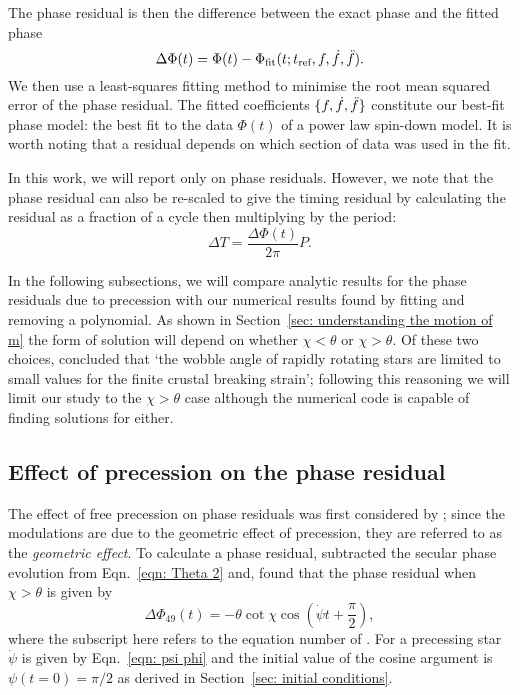 \documentclass[../full_thesis/full_thesis.tex]{subfiles}
\begin{document}
The phase residual is then the difference between the exact phase
and the fitted phase
\begin{equation}
  \Delta\Phi(t) = \Phi(t) - \Phi_{\mathrm{fit}}(t; t_{\textrm{ref}}, f, \dot{f}, \ddot{f}).
\end{equation}
We then use a least-squares fitting method to minimise the root mean squared
error of the phase residual. The fitted coefficients $\{f, \dot{f},
\ddot{f}\}$ constitute our best-fit phase model: the best fit to the data
$\Phi(t)$ of a power law spin-down model.  It is worth noting that a residual
depends on which section of data was used in the fit.

In this work, we will report only on phase residuals. However, we note that the
phase residual can also be re-scaled to give the timing residual by calculating
the residual as a fraction of a cycle then multiplying by the period:
\begin{equation}
    \Delta T = \frac{\Delta\Phi(t)}{2\pi} P.
    \label{eqn: phase to timing}
\end{equation}

In the following subsections, we will compare analytic results for the phase
residuals due to precession with our numerical results found by fitting and
removing a polynomial. As shown in Section~\ref{sec: understanding the motion of m}
the form of solution will depend on whether $\chi < \theta$ or $\chi > \theta$.
Of these two choices, \citet{Jones2001} concluded that `the wobble angle of
rapidly rotating stars are limited to small values for the finite crustal
breaking strain'; following this reasoning we will limit our study to the
$\chi > \theta$ case although the numerical code is capable of finding solutions
for either.

\subsection{Effect of precession on the phase residual}

The effect of free precession on phase residuals was first considered by
\citet{Nelson1990}; since the modulations are due to the geometric effect of
precession, they are referred to as the \emph{geometric effect}. To calculate a
phase residual, \citet{Jones2001} subtracted the secular phase evolution from
Eqn.~\ref{eqn: Theta 2} and, found that the phase residual when $\chi > \theta$
is given by
\begin{equation}
    \Delta\Phi_{49}(t) = -\theta \cot\chi\cos\left(\dot{\psi}t + \frac{\pi}{2}\right),
    \label{eqn: Jones 49}
\end{equation}
where the subscript here refers to the equation number of \citet{Jones2001}.
For a precessing star $\dot{\psi}$ is given by Eqn.~\eqref{eqn: psi phi} and
the initial value of the cosine argument is $\psi(t=0)=\pi/2$ as derived in
Section~\ref{sec: initial conditions}.
\end{document}
